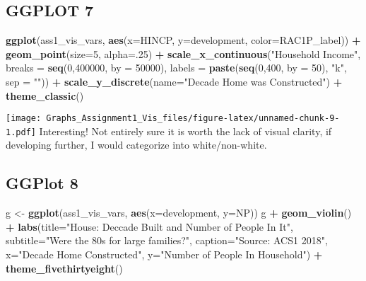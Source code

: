 \documentclass[
]{article}
\newenvironment{Shaded}{\begin{snugshade}}{\end{snugshade}}
\newcommand{\DataTypeTok}[1]{\textcolor[rgb]{0.13,0.29,0.53}{#1}}
\newcommand{\DecValTok}[1]{\textcolor[rgb]{0.00,0.00,0.81}{#1}}
\newcommand{\KeywordTok}[1]{\textcolor[rgb]{0.13,0.29,0.53}{\textbf{#1}}}
\newcommand{\NormalTok}[1]{#1}
\newcommand{\OperatorTok}[1]{\textcolor[rgb]{0.81,0.36,0.00}{\textbf{#1}}}
\newcommand{\StringTok}[1]{\textcolor[rgb]{0.31,0.60,0.02}{#1}}
\begin{document}
\hypertarget{ggplot-7}{%
\subsection{GGPLOT 7}\label{ggplot-7}}

\begin{Shaded}
\begin{Highlighting}[]
\KeywordTok{ggplot}\NormalTok{(ass1_vis_vars, }\KeywordTok{aes}\NormalTok{(}\DataTypeTok{x=}\NormalTok{HINCP, }\DataTypeTok{y=}\NormalTok{development, }\DataTypeTok{color=}\NormalTok{RAC1P_label)) }\OperatorTok{+}
\StringTok{  }\KeywordTok{geom_point}\NormalTok{(}\DataTypeTok{size=}\DecValTok{5}\NormalTok{, }\DataTypeTok{alpha=}\NormalTok{.}\DecValTok{25}\NormalTok{) }\OperatorTok{+}
\StringTok{  }\KeywordTok{scale_x_continuous}\NormalTok{(}\StringTok{"Household Income"}\NormalTok{,}
                      \DataTypeTok{breaks =} \KeywordTok{seq}\NormalTok{(}\DecValTok{0}\NormalTok{,}\DecValTok{400000}\NormalTok{, }\DataTypeTok{by =} \DecValTok{50000}\NormalTok{),}
                     \DataTypeTok{labels =} \KeywordTok{paste}\NormalTok{(}\KeywordTok{seq}\NormalTok{(}\DecValTok{0}\NormalTok{,}\DecValTok{400}\NormalTok{, }\DataTypeTok{by =} \DecValTok{50}\NormalTok{),}
                     \StringTok{"k"}\NormalTok{, }\DataTypeTok{sep =} \StringTok{""}\NormalTok{)) }\OperatorTok{+}\StringTok{ }
\StringTok{  }\KeywordTok{scale_y_discrete}\NormalTok{(}\DataTypeTok{name=}\StringTok{"Decade Home was Constructed"}\NormalTok{) }\OperatorTok{+}\StringTok{ }
\StringTok{  }\KeywordTok{theme_classic}\NormalTok{()}
\end{Highlighting}
\end{Shaded}

\texttt{[image: Graphs\_Assignment1\_Vis\_files/figure-latex/unnamed-chunk-9-1.pdf]}
Interesting! Not entirely sure it is worth the lack of visual clarity,
if developing further, I would categorize into white/non-white.

\hypertarget{ggplot-8}{%
\subsection{GGPlot 8}\label{ggplot-8}}

\begin{Shaded}
\begin{Highlighting}[]
\NormalTok{g <-}\StringTok{ }\KeywordTok{ggplot}\NormalTok{(ass1_vis_vars, }\KeywordTok{aes}\NormalTok{(}\DataTypeTok{x=}\NormalTok{development, }\DataTypeTok{y=}\NormalTok{NP))}
\NormalTok{g }\OperatorTok{+}\StringTok{ }\KeywordTok{geom_violin}\NormalTok{() }\OperatorTok{+}\StringTok{ }
\StringTok{  }\KeywordTok{labs}\NormalTok{(}\DataTypeTok{title=}\StringTok{"House: Deccade Built and Number of People In It"}\NormalTok{, }
       \DataTypeTok{subtitle=}\StringTok{"Were the 80s for large families?"}\NormalTok{,}
       \DataTypeTok{caption=}\StringTok{"Source: ACS1 2018"}\NormalTok{,}
       \DataTypeTok{x=}\StringTok{"Decade Home Constructed"}\NormalTok{,}
       \DataTypeTok{y=}\StringTok{"Number of People In Household"}\NormalTok{) }\OperatorTok{+}
\KeywordTok{theme_fivethirtyeight}\NormalTok{()}
\end{Highlighting}
\end{Shaded}
\end{document}
